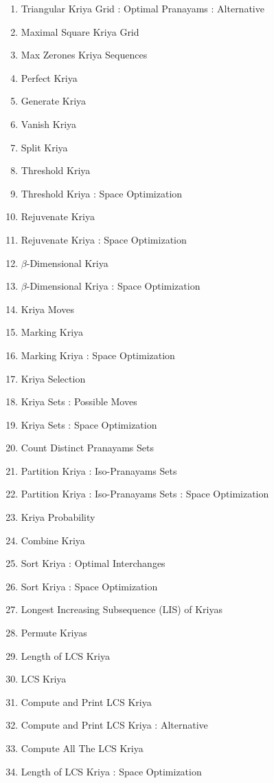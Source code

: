 \begin{enumerate}[noitemsep]
    \item Triangular Kriya Grid : Optimal Pranayams : Alternative
    \item Maximal Square Kriya Grid 
    \item Max Zerones Kriya Sequences 
    \item Perfect Kriya
    \item Generate Kriya 
    \item Vanish Kriya 
    \item Split Kriya
    \item Threshold Kriya 
    \item Threshold Kriya : Space Optimization
    \item Rejuvenate Kriya
    \item Rejuvenate Kriya : Space Optimization
    \item $\beta$-Dimensional Kriya
    \item $\beta$-Dimensional Kriya : Space Optimization 
    \item Kriya Moves
    \item Marking Kriya
    \item Marking Kriya : Space Optimization 
    \item Kriya Selection 
    \item Kriya Sets : Possible Moves 
    \item Kriya Sets : Space Optimization 
    \item Count Distinct Pranayams Sets
    \item Partition Kriya : Iso-Pranayams Sets 
    \item Partition Kriya : Iso-Pranayams Sets : Space Optimization
    \item Kriya Probability 
    \item  Combine Kriya 
    \item  Sort Kriya : Optimal Interchanges
    \item  Sort Kriya : Space Optimization 
    \item  Longest Increasing Subsequence (LIS) of Kriyas 
    \item  Permute Kriyas 
    \item  Length of LCS Kriya 
    \item  LCS Kriya
    \item  Compute and Print LCS Kriya
    \item  Compute and Print LCS Kriya : Alternative 
    \item  Compute All The LCS Kriya
    \item  Length of LCS Kriya : Space Optimization

\end{enumerate}
